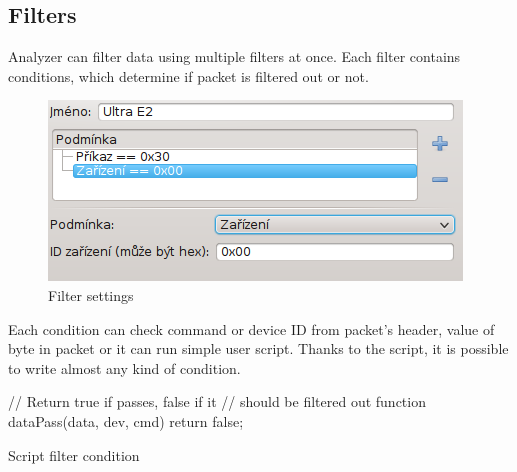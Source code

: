 \documentclass[12pt, a4paper, oneside]{article}
\begin{document}
\subsection{Filters}
Analyzer can filter data using multiple filters at once. Each filter contains conditions, which determine if packet is filtered out or not.
\begin{figure}[H]
\begin{center}
\includegraphics[scale=1]{img/filters.png}
\caption{Filter settings}
\end{center}
\end{figure}
Each condition can check command or device ID from packet's header, value of byte in packet or  it can run simple user script. Thanks to the script, it is possible to write almost any kind of condition.

\begin{listing}[H]
\begin{jscode}
// Return true if passes, false if it
// should be filtered out
function dataPass(data, dev, cmd) {
    return false;
}
\end{jscode}
\caption{Script filter condition}
\end{listing}

\end{document}
